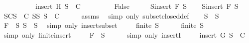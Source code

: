 \begin{isabellebody}
\ \ \ \ \ \ \ \ \ \ {\isachardoublequoteopen}insert\ H\ S{}\ {\isasymnotin}\ C{\isachardoublequoteclose}\isanewline
\ \ \ \ \ \ \ \ \ {\isachardoublequoteopen}False{\isachardoublequoteclose}\isanewline
%
\isadelimproof
%
\endisadelimproof
%
\isatagproof
{}\isamarkupfalse%
\ {\isacharminus}\isanewline
\ \ \isamarkupfalse%
\ {\isacharquery}S{}{\isacharequal}{\isachardoublequoteopen}insert\ F\ S{}{\isachardoublequoteclose}\isanewline
\ \ \isamarkupfalse%
\ {\isacharquery}S{}{\isacharequal}{\isachardoublequoteopen}insert\ F\ S{}{\isachardoublequoteclose}\isanewline
\ \ \isamarkupfalse%
\ SC{\isacharcolon}{\isachardoublequoteopen}{\isasymforall}S\ {\isasymin}\ C{\isachardot}\ {\isasymforall}S{\isacharprime}{\isasymsubseteq}S{\isachardot}\ S{\isacharprime}\ {\isasymin}\ C{\isachardoublequoteclose}\isanewline
\ \ \ \ \isamarkupfalse%
\ assms{\isacharparenleft}{}{\isacharparenright}\ \isamarkupfalse%
\ {\isacharparenleft}simp\ only{\isacharcolon}\ subset{\isacharunderscore}closed{\isacharunderscore}def{\isacharparenright}\isanewline
\ \ \isamarkupfalse%
\ {}{\isacharcolon}{\isachardoublequoteopen}{\isacharquery}S{}\ {\isasymsubseteq}\ S{\isachardoublequoteclose}\isanewline
\ \ \ \ \isamarkupfalse%
\ {\isacartoucheopen}F\ {\isasymin}\ S{\isacartoucheclose}\ {\isacartoucheopen}S{}\ {\isasymsubseteq}\ S{\isacartoucheclose}\ \isamarkupfalse%
\ {\isacharparenleft}simp\ only{\isacharcolon}\ insert{\isacharunderscore}subset{\isacharparenright}\ \isanewline
\ \ \isamarkupfalse%
\ {}{\isacharcolon}{\isachardoublequoteopen}finite\ {\isacharquery}S{}{\isachardoublequoteclose}\isanewline
\ \ \ \ \isamarkupfalse%
\ {\isacartoucheopen}finite\ S{}{\isacartoucheclose}\ \isamarkupfalse%
\ {\isacharparenleft}simp\ only{\isacharcolon}\ finite{\isacharunderscore}insert{\isacharparenright}\ \isanewline
\ \ \isamarkupfalse%
\ {}{\isacharcolon}{\isachardoublequoteopen}F\ {\isasymin}\ {\isacharquery}S{}{\isachardoublequoteclose}\isanewline
\ \ \ \ \isamarkupfalse%
\ {\isacharparenleft}simp\ only{\isacharcolon}\ insertI{}{\isacharparenright}\ \isanewline
\ \ \isamarkupfalse%
\ {}{\isacharcolon}{\isachardoublequoteopen}insert\ G\ {\isacharquery}S{}\ {\isasymnotin}\ C{\isachardoublequoteclose}\ \isanewline

\end{isabellebody}
